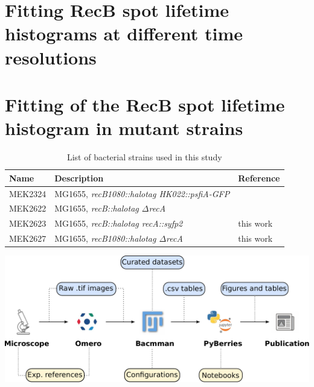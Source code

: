 \clearpage

\section{Fitting RecB spot lifetime histograms at different time resolutions}
\label{note:frame_intervals}



\section{Fitting of the RecB spot lifetime histogram in mutant strains}
\label{note:mutants_fitting}


\clearpage

\setlength\intextsep{40pt}


\begin{table}[htbp]
    \centering
    \begin{tabular}{lll}
        \toprule
        Name & Description & Reference\\
        \midrule
        MEK2324 & MG1655, \textit{recB1080::halotag HK022::psfiA-GFP} & \\ %
        MEK2622 & MG1655, \textit{recB::halotag $\Delta$recA} & \\ %
        MEK2623 & MG1655, \textit{recB::halotag recA::syfp2} & this work\\
        MEK2627 & MG1655, \textit{recB1080::halotag $\Delta$recA} & this work \\
         \bottomrule
    \end{tabular}
    \caption{List of bacterial strains used in this study}
    \label{tab:strains}
\end{table}

\begin{suppfigure*}[htbp]
\begin{center}
\includegraphics[width=\textwidth]{SI_Figures/Data_analysis_workflow.pdf}
\end{center}
\caption{Data storage and analysis pipeline used in this study. Blue labels indicate stored data and yellow labels indicate code and references that would allow reproducing the different analysis steps.}
\label{SIFig:analysis_workflow}
\end{suppfigure*}


